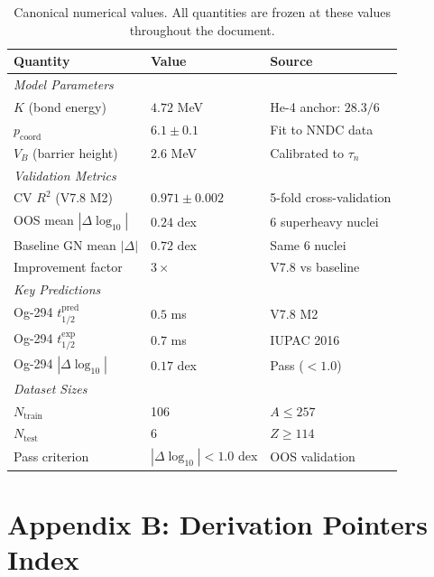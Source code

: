 \documentclass[11pt,a4paper]{article}
\begin{document}
\begin{table}[h]
\centering
\begin{tabular}{lll}
\toprule
\textbf{Quantity} & \textbf{Value} & \textbf{Source} \\
\midrule
\multicolumn{3}{l}{\textit{Model Parameters}} \\
$K$ (bond energy) & $4.72$ MeV & He-4 anchor: $28.3/6$ \\
$p_{\mathrm{coord}}$ & $6.1 \pm 0.1$ & Fit to NNDC data \\
$V_B$ (barrier height) & $2.6$ MeV & Calibrated to $\tau_n$ \\
\midrule
\multicolumn{3}{l}{\textit{Validation Metrics}} \\
CV $R^2$ (V7.8 M2) & $0.971 \pm 0.002$ & 5-fold cross-validation \\
OOS mean $|\Delta\log_{10}|$ & $0.24$ dex & 6 superheavy nuclei \\
Baseline GN mean $|\Delta|$ & $0.72$ dex & Same 6 nuclei \\
Improvement factor & $3\times$ & V7.8 vs baseline \\
\midrule
\multicolumn{3}{l}{\textit{Key Predictions}} \\
Og-294 $t_{1/2}^{\text{pred}}$ & $0.5$ ms & V7.8 M2 \\
Og-294 $t_{1/2}^{\text{exp}}$ & $0.7$ ms & IUPAC 2016 \\
Og-294 $|\Delta\log_{10}|$ & $0.17$ dex & Pass ($<1.0$) \\
\midrule
\multicolumn{3}{l}{\textit{Dataset Sizes}} \\
$N_{\text{train}}$ & 106 & $A \leq 257$ \\
$N_{\text{test}}$ & 6 & $Z \geq 114$ \\
Pass criterion & $|\Delta\log_{10}| < 1.0$ dex & OOS validation \\
\bottomrule
\end{tabular}
\caption{Canonical numerical values. All quantities are frozen at these values throughout the document.}
\label{tab:numbers_registry}
\end{table}

\section{Appendix B: Derivation Pointers Index}
\label{app:pointers}
\end{document}
